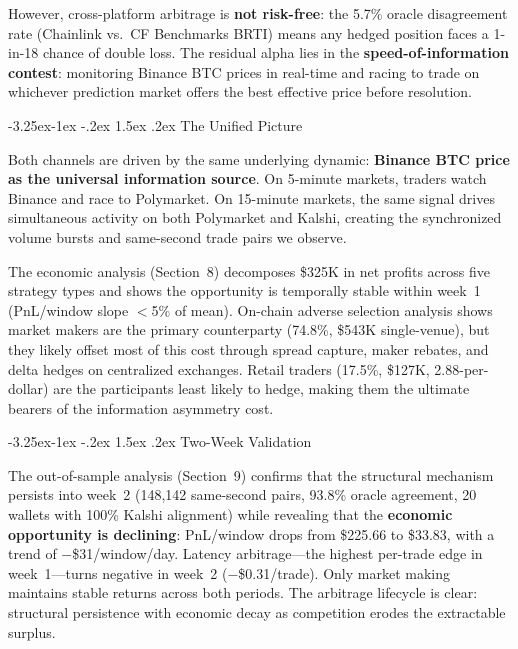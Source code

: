 \documentclass[11pt,a4paper]{article}
\makeatletter
\renewcommand\subsection{\@startsection{subsection}{2}{\z@}%
  {-3.25ex\@plus -1ex \@minus -.2ex}%
  {1.5ex \@plus .2ex}%
  {\normalfont\large\bfseries}}
\makeatother
\begin{document}
However, cross-platform arbitrage is \textbf{not risk-free}: the 5.7\% oracle disagreement rate (Chainlink vs.\ CF Benchmarks BRTI) means any hedged position faces a 1-in-18 chance of double loss. The residual alpha lies in the \textbf{speed-of-information contest}: monitoring Binance BTC prices in real-time and racing to trade on whichever prediction market offers the best effective price before resolution.

\subsection{The Unified Picture}

Both channels are driven by the same underlying dynamic: \textbf{Binance BTC price as the universal information source}. On 5-minute markets, traders watch Binance and race to Polymarket. On 15-minute markets, the same signal drives simultaneous activity on both Polymarket and Kalshi, creating the synchronized volume bursts and same-second trade pairs we observe.

The economic analysis (Section~8) decomposes \$325K in net profits across five strategy types and shows the opportunity is temporally stable within week~1 (PnL/window slope $<$5\% of mean). On-chain adverse selection analysis shows market makers are the primary counterparty (74.8\%, \$543K single-venue), but they likely offset most of this cost through spread capture, maker rebates, and delta hedges on centralized exchanges. Retail traders (17.5\%, \$127K, 2.88\textcent-per-dollar) are the participants least likely to hedge, making them the ultimate bearers of the information asymmetry cost.

\subsection{Two-Week Validation}

The out-of-sample analysis (Section~9) confirms that the structural mechanism persists into week~2 (148,142 same-second pairs, 93.8\% oracle agreement, 20 wallets with 100\% Kalshi alignment) while revealing that the \textbf{economic opportunity is declining}: PnL/window drops from \$225.66 to \$33.83, with a trend of $-$\$31/window/day. Latency arbitrage---the highest per-trade edge in week~1---turns negative in week~2 ($-$\$0.31/trade). Only market making maintains stable returns across both periods. The arbitrage lifecycle is clear: structural persistence with economic decay as competition erodes the extractable surplus.
\end{document}
